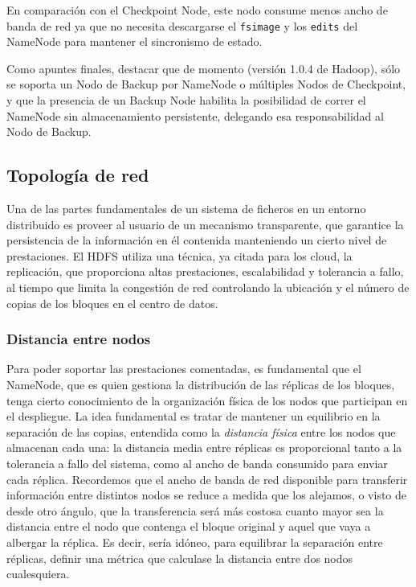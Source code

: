 En comparaci\'on con el Checkpoint Node, este nodo consume menos ancho de banda de red ya que no necesita descargarse el \texttt{fsimage} y los \texttt{edits} del NameNode para mantener el sincronismo de estado.\newline

Como apuntes finales, destacar que de momento (versi\'on 1.0.4 de Hadoop), s\'olo se soporta un Nodo de Backup por NameNode o m\'ultiples Nodos de Checkpoint, y que la presencia de un Backup Node habilita la posibilidad de correr el NameNode sin almacenamiento persistente, delegando esa res\-pon\-sa\-bi\-li\-dad al Nodo de Backup.


\subsection{Topolog\'ia de red}\label{subsec:topologiared}
\noindent Una de las partes fundamentales de un sistema de ficheros en un entorno distribuido es proveer al usuario de un mecanismo transparente, que garantice la persistencia de la informaci\'on en \'el contenida manteniendo un cierto nivel de prestaciones. El HDFS utiliza una t\'ecnica, ya citada para los cloud, la replicaci\'on, que proporciona altas prestaciones, escalabilidad y tolerancia a fallo, al tiempo que limita la congesti\'on de red controlando la ubicaci\'on y el n\'umero de copias de los bloques en el centro de datos.

\subsubsection{Distancia entre nodos}\label{subsubsec:distnodos}
\noindent Para poder soportar las prestaciones comentadas, es fundamental que el NameNode, que es quien gestiona la distribuci\'on de las r\'eplicas de los bloques, tenga cierto conocimiento de la organizaci\'on f\'isica de los nodos que participan en el despliegue. La idea fundamental es tratar de mantener un equilibrio en la separaci\'on de las copias, entendida como la \emph{distancia f\'isica} entre los nodos que almacenan cada una: la distancia media entre r\'eplicas es proporcional tanto a la tolerancia a fallo del sistema, como al ancho de banda consumido para enviar cada r\'eplica. Recordemos que el ancho de banda de red disponible para transferir informaci\'on entre distintos nodos se reduce a medida que los alejamos, o visto de desde otro \'angulo, que la transferencia ser\'a m\'as costosa cuanto mayor sea la distancia entre el nodo que contenga el bloque original y aquel que vaya a albergar la r\'eplica. Es decir, ser\'ia id\'oneo, para equilibrar la separaci\'on entre r\'eplicas, definir una m\'etrica que calculase la distancia entre dos nodos cualesquiera.\newline

